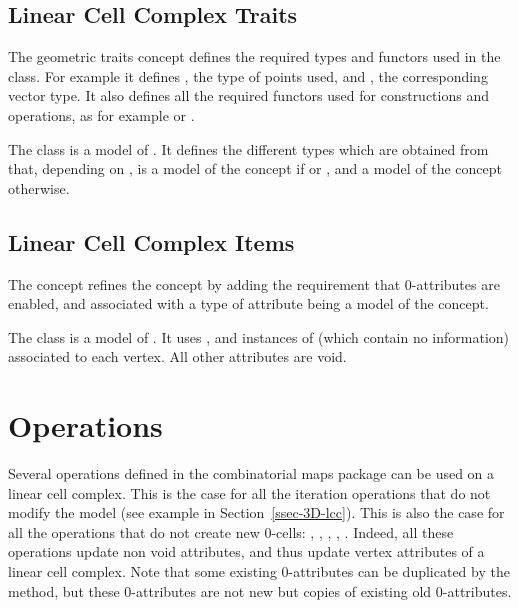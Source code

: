 \subsection{Linear Cell Complex Traits}\label{ssec-lcc-traits}

The  geometric traits concept defines the
required types and functors used in the 
class. For example it defines , the type of points used,
and , the corresponding vector type.  It also defines all
the required functors used for constructions and operations, as for
example  or
.

The class  is a model of
. It defines the different types which
are obtained from  that, depending on , is a model of
the concept  if  or , and a model of
the concept  otherwise.


\subsection{Linear Cell Complex Items}\label{ssec-lcc-item}

The  concept refines the
 concept by adding the requirement that
0-attributes are enabled, and associated with a type of attribute
being a model of the  concept.  

The class  is a
model of . It uses ,
and instances of 
(which contain no information) associated to each vertex. All other
attributes are void.  

\section{Operations}

Several operations defined in the combinatorial maps package can be
used on a linear cell complex. This is the case for all the iteration
operations that do not modify the model (see example in 
Section~\ref{ssec-3D-lcc}). This is also the case for
all the operations that do not create new 0-cells: ,
, , ,
.  Indeed, all these operations update
non void attributes, and thus update vertex attributes of a linear
cell complex. Note that some existing 0-attributes can be duplicated
by the  method, but these 0-attributes are not new but
copies of existing old 0-attributes.


